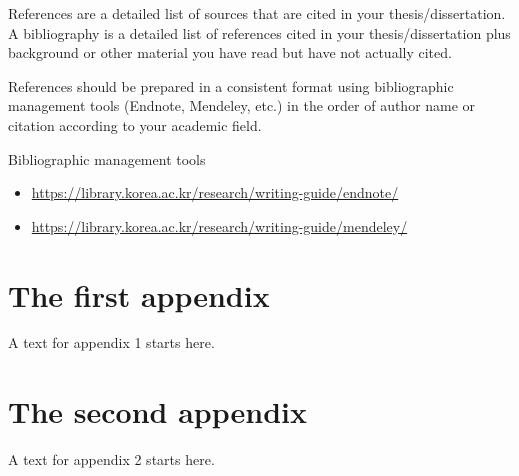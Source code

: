 \documentclass[11pt]{report}
\begin{document}
\vspace{1cm}

\normalsize
References are a detailed list of sources that are cited in your thesis/dissertation. A bibliography is a detailed list of references cited in your thesis/dissertation plus background or other material you have read but have not actually cited.

References should be prepared in a consistent format using bibliographic management tools (Endnote, Mendeley, etc.) in the order of author name or citation according to your academic field.


Bibliographic management tools
\begin{itemize}
\item\url{https://library.korea.ac.kr/research/writing-guide/endnote/}
\item\url{https://library.korea.ac.kr/research/writing-guide/mendeley/}
\end{itemize}

\newpage
\appendix
{}
\chapter{The first  appendix}
A text for appendix 1 starts here.

\newpage
\chapter{The second appendix}
A text for appendix 2 starts here.

\newpage
{}
\printindex
\end{document}

